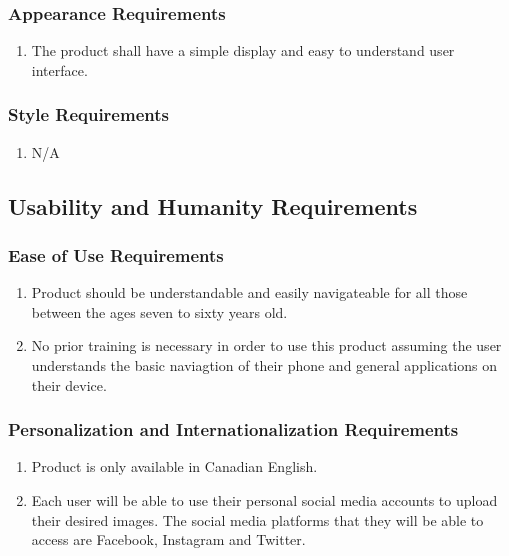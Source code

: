 \documentclass[]{article}
\begin{document}
\subsubsection{Appearance Requirements}
\label{ssub:appearance_requirements}
\begin{enumerate}[{LF}1. ]
	\item The product shall have a simple display and easy to understand user interface.
\end{enumerate}

\subsubsection{Style Requirements}
\label{ssub:style_requirements}
\begin{enumerate}[{LF}1. ]
	\item N/A
\end{enumerate}


\subsection{Usability and Humanity Requirements}
\label{sub:usability_and_humanity_requirements}

\subsubsection{Ease of Use Requirements}
\label{ssub:ease_of_use_requirements}
\begin{enumerate}[{UH}1. ]
	\item Product should be understandable and easily navigateable for all those between the ages seven to sixty years old.
	\item No prior training is necessary in order to use this product assuming the user understands the basic naviagtion of their phone and general applications on their device.
\end{enumerate}

\subsubsection{Personalization and Internationalization Requirements}
\label{ssub:personalization_and_internationalization_requirements}
\begin{enumerate}[{UH}1. ]
	\item Product is only available in Canadian English.
	\item Each user will be able to use their personal social media accounts to upload their desired images. The social media platforms that they will be able to access are Facebook, Instagram and Twitter.
\end{enumerate}
\end{document}
